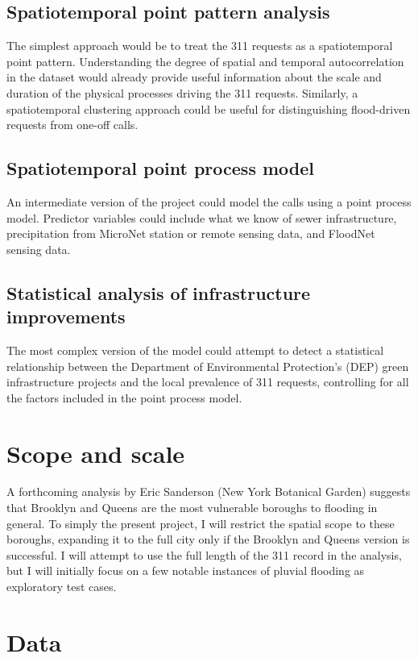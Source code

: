 \documentclass[11pt]{article}
\begin{document}
\subsection{Spatiotemporal point pattern analysis}
\label{sec:org9c5e740}
The simplest approach would be to treat the 311 requests as a spatiotemporal point pattern. Understanding the degree of spatial and temporal autocorrelation in the dataset would already provide useful information about the scale and duration of the physical processes driving the 311 requests. Similarly, a spatiotemporal clustering approach could be useful for distinguishing flood-driven requests from one-off calls.

\subsection{Spatiotemporal point process model}
\label{sec:org61f6fcb}
An intermediate version of the project could model the calls using a
point process model. Predictor variables could include what we know of
sewer infrastructure, precipitation from MicroNet station or remote
sensing data, and FloodNet sensing data.

\subsection{Statistical analysis of infrastructure improvements}
\label{sec:orgc546f77}
The most complex version of the model could attempt to detect a statistical relationship between the Department of Environmental Protection's (DEP) green infrastructure projects and the local prevalence of 311 requests, controlling for all the factors included in the point process model.

\section{Scope and scale}
\label{sec:org6598624}
A forthcoming analysis by Eric Sanderson (New York Botanical Garden)
suggests that Brooklyn and Queens are the most vulnerable boroughs to
flooding in general. To simply the present project, I will restrict the spatial scope to these boroughs, expanding it to the full city only if the Brooklyn and Queens version is successful. I will attempt to use the full length of the 311 record in the analysis, but I will initially focus on a few notable instances of pluvial flooding as exploratory test cases.

\section{Data}
\label{sec:org8774038}
\end{document}
